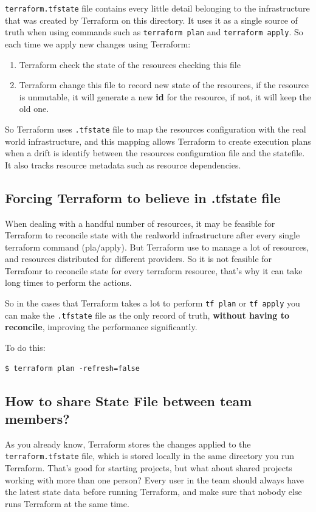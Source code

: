 \documentclass{article}
\newenvironment{codetemplate}[1][]{%
  \mybasecolorbox[#1]
  \itshape
}{%
  \endmybasecolorbox
}
\begin{document}
\verb+terraform.tfstate+ file contains every little detail belonging to the infrastructure that was created by Terraform on this directory. It uses it as a single source of truth when using commands such as \verb+terraform plan+ and \verb+terraform apply+. So each time we apply new changes using Terraform:
\begin{enumerate}
    \item Terraform check the state of the resources checking this file
    \item Terraform change this file to record new state of the resources, if the resource is unmutable, it will generate a new \textbf{id} for the resource, if not, it will keep the old one.
\end{enumerate}

So Terraform uses \verb+.tfstate+ file to map the resources configuration with the real world infrastructure, and this mapping allows Terraform to create execution plans when a drift is identify between the resources configuration file and the statefile. It also tracks resource metadata such as resource dependencies.

\subsection{Forcing Terraform to believe in .tfstate file}
When dealing with a handful number of resources, it may be feasible for Terraform to reconcile state with the realworld infrastructure after every single terraform command (pla/apply). But Terraform use to manage a lot of resources, and resources distributed for different providers. So it is not feasible for Terrafomr to reconcile state for every terraform resource, that's why it can take long times to perform the actions.

So in the cases that Terraform takes a lot to perform \verb+tf plan+ or \verb+tf apply+ you can make the \verb+.tfstate+ file as the only record of truth, \textbf{without having to reconcile}, improving the performance significantly. 

To do this:
\begin{codetemplate}{}
\begin{verbatim}
$ terraform plan -refresh=false
\end{verbatim}
\end{codetemplate}

\subsection{How to share State File between team members?}
As you already know, Terraform stores the changes applied to the \verb+terraform.tfstate+ file, which is stored locally in the same directory you run Terraform. That's good for starting projects, but what about shared projects working with more than one person? Every user in the team should always have the latest state data before running Terraform, and make sure that nobody else runs Terraform at the same time.
\end{document}
